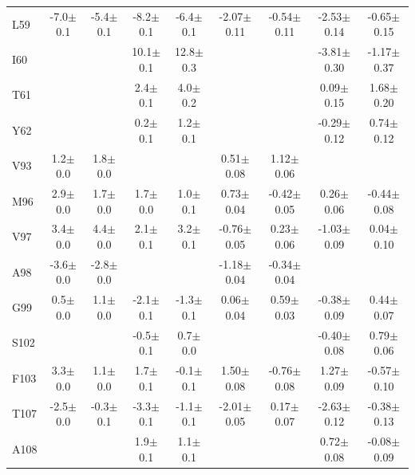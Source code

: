 \documentclass[%
 aip,
 amsmath,amssymb,
 preprint,%
]{revtex4-1}
\begin{document}
\begin{center}
\begin{longtable}{l|c|c|c|c|c|c|c|c}
\endhead
L59 & -7.0$\pm$0.1 & -5.4$\pm$0.1 & -8.2$\pm$0.1 & -6.4$\pm$0.1 & -2.07$\pm$0.11 & -0.54$\pm$0.11 & -2.53$\pm$0.14 & -0.65$\pm$0.15 \\
I60 & & & 10.1$\pm$0.1 & 12.8$\pm$0.3 & & & -3.81$\pm$0.30 & -1.17$\pm$0.37 \\
T61 & & & 2.4$\pm$0.1 & 4.0$\pm$0.2 & & & 0.09$\pm$0.15 & 1.68$\pm$0.20 \\
Y62 & & & 0.2$\pm$0.1 & 1.2$\pm$0.1 & & & -0.29$\pm$0.12 & 0.74$\pm$0.12 \\
V93 & 1.2$\pm$0.0 & 1.8$\pm$0.0 & & & 0.51$\pm$0.08 & 1.12$\pm$0.06 & & \\
M96 & 2.9$\pm$0.0 & 1.7$\pm$0.0 & 1.7$\pm$0.0 & 1.0$\pm$0.1 & 0.73$\pm$0.04 & -0.42$\pm$0.05 & 0.26$\pm$0.06 & -0.44$\pm$0.08 \\
V97 & 3.4$\pm$0.0 & 4.4$\pm$0.0 & 2.1$\pm$0.1 & 3.2$\pm$0.1 & -0.76$\pm$0.05 & 0.23$\pm$0.06 & -1.03$\pm$0.09 & 0.04$\pm$0.10 \\
A98 & -3.6$\pm$0.0 & -2.8$\pm$0.0 & & & -1.18$\pm$0.04 & -0.34$\pm$0.04 & & \\
G99 & 0.5$\pm$0.0 & 1.1$\pm$0.0 & -2.1$\pm$0.1 & -1.3$\pm$0.1 & 0.06$\pm$0.04 & 0.59$\pm$0.03 & -0.38$\pm$0.09 & 0.44$\pm$0.07 \\
S102 & & & -0.5$\pm$0.1 & 0.7$\pm$0.0 & & & -0.40$\pm$0.08 & 0.79$\pm$0.06 \\
F103 & 3.3$\pm$0.0 & 1.1$\pm$0.0 & 1.7$\pm$0.1 & -0.1$\pm$0.1 & 1.50$\pm$0.08 & -0.76$\pm$0.08 & 1.27$\pm$0.09 & -0.57$\pm$0.10 \\
T107 & -2.5$\pm$0.0 & -0.3$\pm$0.1 & -3.3$\pm$0.1 & -1.1$\pm$0.1 & -2.01$\pm$0.05 & 0.17$\pm$0.07 & -2.63$\pm$0.12 & -0.38$\pm$0.13 \\
A108 & & & 1.9$\pm$0.1 & 1.1$\pm$0.1 & & & 0.72$\pm$0.08 & -0.08$\pm$0.09 \\
\end{longtable}
\end{center}
\endgroup


\end{document}
